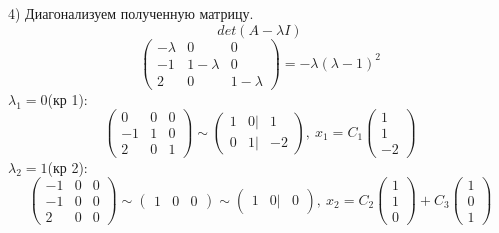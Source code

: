\documentclass{article}
\begin{document}
    4) Диагонализуем полученную матрицу.
    \begin{equation*}
        det(A-\lambda I)
    \end{equation*}
    \begin{equation*}
        \begin{pmatrix}
            -\lambda&0&0 \\
            -1&1-\lambda&0\\
            2&0&1-\lambda
        \end{pmatrix}=-\lambda(\lambda-1)^2
        \end{equation*}
    $\lambda_1=0$(кр 1):\\
    \begin{equation*}
        \begin{pmatrix}
            0&0&0 \\
            -1&1&0\\
            2&0&1
        \end{pmatrix}\sim 
        \begin{pmatrix}
            1&0|&1 \\
            0&1|&-2
        \end{pmatrix},\ x_1=C_1
        \begin{pmatrix}
            1\\
            1\\
            -2
        \end{pmatrix}
    \end{equation*}
    $\lambda_2=1$(кр 2):\\
    \begin{equation*}
        \begin{pmatrix}
            -1&0&0 \\
            -1&0&0\\
            2&0&0
        \end{pmatrix}\sim 
        \begin{pmatrix}
            1&0&0 
        \end{pmatrix}\sim 
        \begin{pmatrix}
            1&0|&0 
        \end{pmatrix},\ x_2=C_2
        \begin{pmatrix}
            1\\
            1\\
            0
        \end{pmatrix}+
        C_3\begin{pmatrix}
            1\\
            0\\
            1
        \end{pmatrix}
    \end{equation*}
\end{document}
